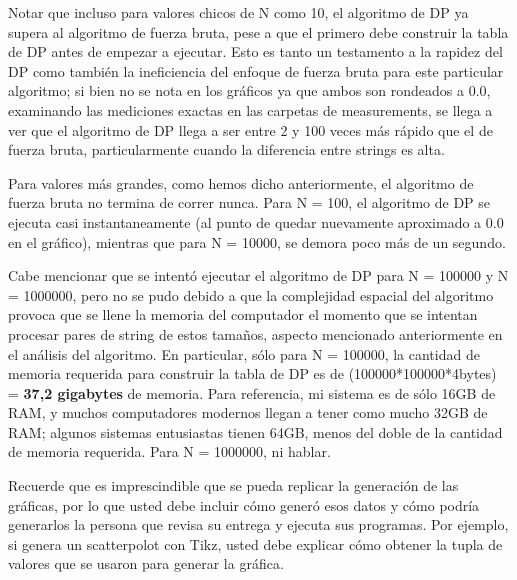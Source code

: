 Notar que incluso para valores chicos de N como 10, el algoritmo de DP ya supera al algoritmo de fuerza bruta, pese a que el primero debe construir la tabla de DP antes de empezar a ejecutar. Esto es tanto un testamento a la rapidez del DP como también la ineficiencia del enfoque de fuerza bruta para este particular algoritmo; si bien no se nota en los gráficos ya que ambos son rondeados a 0.0, examinando las mediciones exactas en las carpetas de measurements, se llega a ver que el algoritmo de DP llega a ser entre 2 y 100 veces más rápido que el de fuerza bruta, particularmente cuando la diferencia entre strings es alta.

Para valores más grandes, como hemos dicho anteriormente, el algoritmo de fuerza bruta no termina de correr nunca. Para N = 100, el algoritmo de DP se ejecuta casi instantaneamente (al punto de quedar nuevamente aproximado a 0.0 en el gráfico), mientras que para N = 10000, se demora poco más de un segundo.

Cabe mencionar que se intentó ejecutar el algoritmo de DP para N = 100000 y N = 1000000, pero no se pudo debido a que la complejidad espacial del algoritmo provoca que se llene la memoria del computador el momento que se intentan procesar pares de string de estos tamaños, aspecto mencionado anteriormente en el análisis del algoritmo. En particular, sólo para N = 100000, la cantidad de memoria requerida para construir la tabla de DP es de (100000*100000*4bytes) = \textbf{37,2 gigabytes} de memoria. Para referencia, mi sistema es de sólo 16GB de RAM, y muchos computadores modernos llegan a tener como mucho 32GB de RAM; algunos sistemas entusiastas tienen 64GB, menos del doble de la cantidad de memoria requerida. Para N = 1000000, ni hablar.


\begin{mdframed}
    Recuerde que es imprescindible que se pueda replicar la generación de las gráficas, por lo que usted debe incluir cómo generó esos datos y  cómo podría generarlos la persona que revisa su entrega y ejecuta sus programas. Por ejemplo, si genera un scatterpolot con Tikz, usted debe explicar cómo obtener la tupla de valores que se usaron para generar la gráfica.
\end{mdframed}
